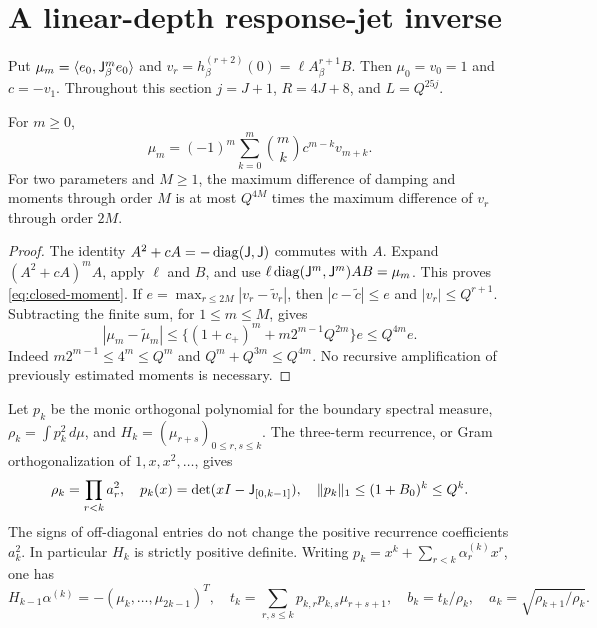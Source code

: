 \section{A linear-depth response-jet inverse}
\label{sec:jet}
Put $\mu_m=\langle e_0,\mathsf J_\beta^m e_0\rangle$ and
$v_r=h_\beta^{(r+2)}(0)=\ell A_\beta^{r+1}B$. Then $\mu_0=v_0=1$ and
$c=-v_1$. Throughout this section $j=J+1$, $R=4J+8$, and
$L=Q^{25j}$.

\begin{lemma}
\label{lem:moments}
For $m\ge0$,
\begin{equation}
 \mu_m=(-1)^m\sum_{k=0}^m\binom mk c^{m-k}v_{m+k}.
 \label{eq:closed-moment}
\end{equation}
For two parameters and $M\ge1$, the maximum difference of damping and moments
through order $M$ is at most $Q^{4M}$ times the maximum difference of $v_r$
through order $2M$.
\end{lemma}
\begin{proof}
The identity $A^2+cA=-\operatorname{diag}(\mathsf J,\mathsf J)$ commutes with $A$.
Expand $(A^2+cA)^m A$, apply $\ell$ and $B$, and use
$\ell\operatorname{diag}(\mathsf J^m,\mathsf J^m)AB=\mu_m$. This proves
\eqref{eq:closed-moment}. If $e=\max_{r\le2M}|v_r-\widetilde v_r|$, then
$|c-\widetilde c|\le e$ and $|v_r|\le Q^{r+1}$.
Subtracting the finite sum, for $1\le m\le M$, gives
\[
 |\mu_m-\widetilde\mu_m|
 \le\{(1+c_+)^m+m2^{m-1}Q^{2m}\}e\le Q^{4m}e.
\]
Indeed $m2^{m-1}\le4^m\le Q^m$ and $Q^m+Q^{3m}\le Q^{4m}$.
No recursive amplification of previously estimated moments is necessary.
\end{proof}

Let $p_k$ be the monic orthogonal polynomial for the boundary spectral measure,
$\rho_k=\int p_k^2\,d\mu$, and $H_k=(\mu_{r+s})_{0\le r,s\le k}$.
The three-term recurrence, or Gram orthogonalization of
$1,x,x^2,\ldots$, gives
\begin{equation}
 \rho_k=\prod_{r<k}a_r^2,\quad
 p_k(x)=\det(xI-\mathsf J_{[0,k-1]}),\quad
 \|p_k\|_1\le(1+B_0)^k\le Q^k.
 \label{eq:poly-norm}
\end{equation}
The signs of off-diagonal entries do not change the positive recurrence
coefficients $a_k^2$. In particular $H_k$ is strictly positive definite.
Writing $p_k=x^k+\sum_{r<k}\alpha_r^{(k)}x^r$, one has
\[
 H_{k-1}\alpha^{(k)}=-(\mu_k,\ldots,\mu_{2k-1})^T,
 \quad t_k=\sum_{r,s\le k}p_{k,r}p_{k,s}\mu_{r+s+1},
 \quad b_k=t_k/\rho_k,\quad a_k=\sqrt{\rho_{k+1}/\rho_k}.
\]

